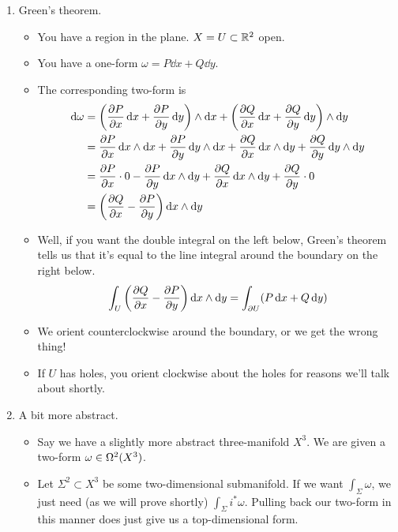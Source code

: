 \documentclass[../notes.tex]{subfiles}
\begin{document}
\begin{itemize}
\begin{enumerate}
\begin{itemize}
        \end{itemize}
        \item Green's theorem.
        \begin{itemize}
            \item You have a region in the plane. $X=U\subset\R^2$ open.
            \item You have a one-form $\omega=P\dd{x}+Q\dd{y}$.
            \item The corresponding two-form is
            \begin{align*}
                \dd\omega &= \left( \pdv{P}{x}\dd{x}+\pdv{P}{y}\dd{y} \right)\wedge\dd{x}+\left( \pdv{Q}{x}\dd{x}+\pdv{Q}{y}\dd{y} \right)\wedge\dd{y}\\
                &= \pdv{P}{x}\dd{x}\wedge\dd{x}+\pdv{P}{y}\dd{y}\wedge\dd{x}+\pdv{Q}{x}\dd{x}\wedge\dd{y}+\pdv{Q}{y}\dd{y}\wedge\dd{y}\\
                &= \pdv{P}{x}\cdot 0-\pdv{P}{y}\dd{x}\wedge\dd{y}+\pdv{Q}{x}\dd{x}\wedge\dd{y}+\pdv{Q}{y}\cdot 0\\
                &= \left( \pdv{Q}{x}-\pdv{P}{y} \right)\dd{x}\wedge\dd{y}
            \end{align*}
            \item Well, if you want the double integral on the left below, Green's theorem tells us that it's equal to the line integral around the boundary on the right below.
            \begin{equation*}
                \int_U\left( \pdv{Q}{x}-\pdv{P}{y} \right)\dd{x}\wedge\dd{y} = \int_{\partial U}(P\dd{x}+Q\dd{y})
            \end{equation*}
            \item We orient counterclockwise around the boundary, or we get the wrong thing!
            \item If $U$ has holes, you orient clockwise about the holes for reasons we'll talk about shortly.
        \end{itemize}
        \item A bit more abstract.
        \begin{itemize}
            \item Say we have a slightly more abstract three-manifold $X^3$. We are given a two-form $\omega\in\ome[2]{X^3}$.
            \item Let $\Sigma^2\subset X^3$ be some two-dimensional submanifold. If we want $\int_\Sigma\omega$, we just need (as we will prove shortly) $\int_\Sigma i^*\omega$. Pulling back our two-form in this manner does just give us a top-dimensional form.

\end{itemize}
\end{enumerate}
\end{itemize}
\end{document}
